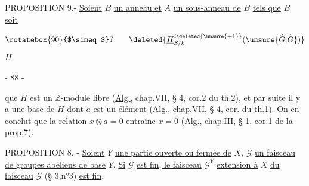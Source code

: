 PROPOSITION 9.- \uline{Soient} $B$ \uline{un anneau et} $A$ \uline{un sous-anneau de} $B$ \uline{tels que} $B$ \uline{soit}

\[
\rotatebox{90}{$\simeq$}?\qquad
\deleted{\underline H^{i\deleted{\unsure{+1}}}_{S/k}(\unsure{\widehat G|\widetilde G})}
\]
$H$

\begin{center}- 88 -\end{center}
que $H$ est un $\mathbb Z$-module libre (\uline{Alg.}, chap.VII, § 4, cor.2 du th.2), et par suite il y a une base de $H$ dont $a$ est un élément (\uline{Alg.}, chap.VII, § 4, cor. du th.1). On en conclut que la relation $x\otimes a=0$ entraîne $x=0$ (\uline{Alg.}, chap.III, § 1, cor.1 de la prop.7).

PROPOSITION 8. - \uline{Soient} $Y$ \uline{une partie ouverte ou fermée de} $X$, $\mathcal G$ \uline{un faisceau de groupes abéliens de base} $Y$. \uline{Si} $\mathcal G$ \uline{est fin, le faisceau} $\mathcal G^Y$ \uline{extension à} $X$ \uline{du faisceau} $\mathcal G$ (§ 3,n°3) \uline{est fin}.

